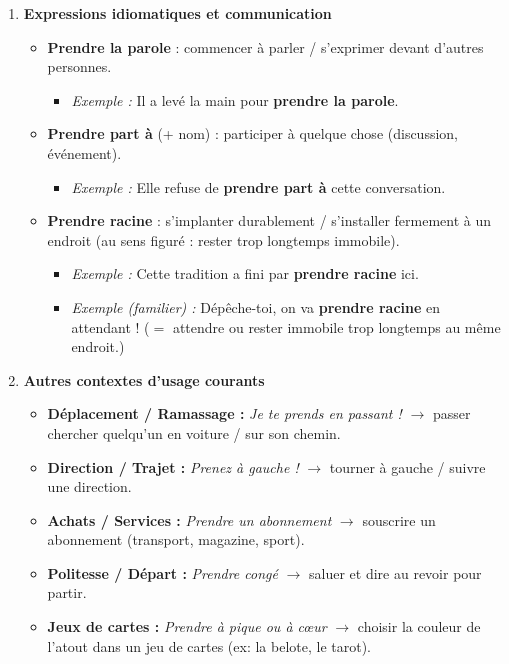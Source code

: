 \documentclass[math,code]{amznotes}
\theoremstyle{remark}
\begin{document}
\begin{enumerate}
    \item \textbf{Expressions idiomatiques et communication}
    \begin{itemize}
        \item \textbf{Prendre la parole} : commencer à parler / s'exprimer devant d'autres personnes.
        \begin{itemize}
            \item \textit{Exemple :} Il a levé la main pour \textbf{prendre la parole}.
        \end{itemize}
        
        \item \textbf{Prendre part à} (+ nom) : participer à quelque chose (discussion, événement).
        \begin{itemize}
            \item \textit{Exemple :} Elle refuse de \textbf{prendre part à} cette conversation.
        \end{itemize}
        
        \item \textbf{Prendre racine} : s'implanter durablement / s'installer fermement à un endroit (au sens figuré : rester trop longtemps immobile).
        \begin{itemize}
            \item \textit{Exemple :} Cette tradition a fini par \textbf{prendre racine} ici.
            \item \textit{Exemple (familier) :} Dépêche-toi, on va \textbf{prendre racine} en attendant ! ($=$ attendre ou rester immobile trop longtemps au même endroit.)
        \end{itemize}
    \end{itemize}

    \item \textbf{Autres contextes d'usage courants}
    \begin{itemize}
        \item \textbf{Déplacement / Ramassage :} \textit{Je te prends en passant !} $\rightarrow$ passer chercher quelqu'un en voiture / sur son chemin.
        \item \textbf{Direction / Trajet :} \textit{Prenez à gauche !} $\rightarrow$ tourner à gauche / suivre une direction.
        \item \textbf{Achats / Services :} \textit{Prendre un abonnement} $\rightarrow$ souscrire un abonnement (transport, magazine, sport).
        \item \textbf{Politesse / Départ :} \textit{Prendre congé} $\rightarrow$ saluer et dire au revoir pour partir.
        \item \textbf{Jeux de cartes :} \textit{Prendre à pique ou à cœur} $\rightarrow$ choisir la couleur de l'atout dans un jeu de cartes (ex: la belote, le tarot).
    \end{itemize}
\end{enumerate}
\end{document}
